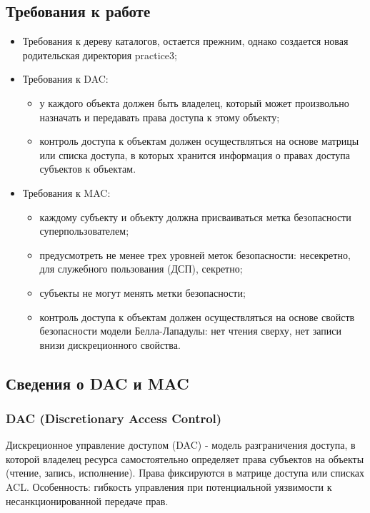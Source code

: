 \documentclass[areasetadvanced]{scrartcl}
\begin{document}
\subsection{Требования к работе}
\begin{itemize}
    \item Требования к дереву каталогов, остается прежним, однако создается новая родительская директория practice3;
    \item Требования к DAC: \begin{itemize}
        \item у каждого объекта должен быть владелец, который может
        произвольно назначать и передавать права доступа к этому объекту;
        \item контроль доступа к объектам должен осуществляться на основе
        матрицы или списка доступа, в которых хранится информация о правах
        доступа субъектов к объектам.
        \end{itemize}
    \item Требования к MAC: \begin{itemize}
        \item каждому субъекту и объекту должна присваиваться метка
        безопасности суперпользователем;
        \item предусмотреть не менее трех уровней меток безопасности: \guillemetleft несекретно\guillemetright, \guillemetleft для служебного пользования (ДСП)\guillemetright, \guillemetleft секретно\guillemetright;
        \item субъекты не могут менять метки безопасности;
        \item контроль доступа к объектам должен осуществляться на основе свойств безопасности модели Белла-Лападулы: \guillemetleft нет чтения сверху\guillemetright, \guillemetleft нет записи вниз\guillemetright и дискреционного свойства.
        \end{itemize}
\end{itemize}

\subsection{Сведения о DAC и MAC}
\subsubsection{DAC (Discretionary Access Control)}
Дискреционное управление доступом (DAC) - модель разграничения доступа, в которой владелец ресурса самостоятельно определяет права субъектов на объекты (чтение, запись, исполнение). Права фиксируются в матрице доступа или списках ACL. Особенность: гибкость управления при потенциальной уязвимости к несанкционированной передаче прав.
\end{document}
